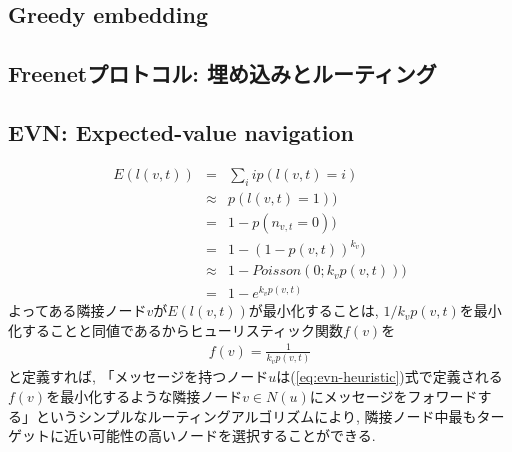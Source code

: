 \documentclass[dvipdfmx]{ampbt}
\begin{document}
   \subsection{Greedy embedding}
   \subsection{Freenetプロトコル: 埋め込みとルーティング} \label{sec:freenetprotocols}
   \subsection{EVN: Expected-value navigation} \label{sec:evn}
    \begin{eqnarray}
     E(l(v,t)) &=& \sum_i ip(l(v,t)=i)\nonumber \\
     &\approx& p(l(v,t)=1)  )\nonumber\\
     &=& 1- p(n_{v,t}=0)  )\nonumber\\
     &=& 1- (1 - p(v,t))^{k_v} )\nonumber\\
     &\approx& 1 - Poisson(0; k_vp(v,t)) )\nonumber\\
     &=& 1- e^{k_vp(v,t)} \label{eq:evn-basic}
    \end{eqnarray}
    よってある隣接ノード$v$が$E(l(v,t))$が最小化することは, $1/k_vp(v,t)$を最小化することと同値であるからヒューリスティック関数$f(v)$を
    \begin{eqnarray}
     f(v) = \frac{1}{k_vp(v,t)}\label{eq:evn-heuristic}
    \end{eqnarray}
    と定義すれば, 「メッセージを持つノード$u$は(\ref{eq:evn-heuristic})式で定義される$f(v)$を最小化するような隣接ノード$v \in N(u)$にメッセージをフォワードする」というシンプルなルーティングアルゴリズムにより, 隣接ノード中最もターゲットに近い可能性の高いノードを選択することができる. 

\cite{clarke2001freenet}
\cite{sandberg2006distributed}
\cite{sandberg2006evolution}
\cite{sandberg2008neighbor}
\cite{mogren2008adaptive}
\cite{evans2007routing}
\cite{clarke2010private}
\cite{schiller2011attack}
\cite{roos2012provable}
\cite{roos2013contribution}
\cite{roos2016dealing}
\cite{hofer2013greedy}
\cite{roos2016anonymous}
\cite{roos2016analyzing}
\cite{kleinberg2000small}
\cite{csimcsek2008navigating}
\cite{serrano2008self}
\cite{boguna2009navigating}
\cite{boguna2009navigability}
\cite{kleinberg2007geographic}
\cite{cvetkovski2009hyperbolic}
\cite{krioukov2010hyperbolic}
\cite{boguna2010sustaining}
\cite{papadopoulos2015network}
\cite{blasius2016efficient}
\cite{kleinberg2006complex}
\cite{huang2014navigation}
\cite{van2010graph}
\fi
\end{document}
